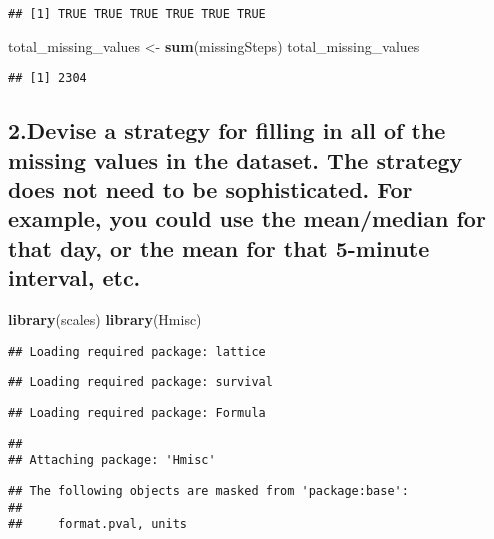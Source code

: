 \documentclass[]{article}
\newenvironment{Shaded}{\begin{snugshade}}{\end{snugshade}}
\newcommand{\KeywordTok}[1]{\textcolor[rgb]{0.13,0.29,0.53}{\textbf{#1}}}
\newcommand{\StringTok}[1]{\textcolor[rgb]{0.31,0.60,0.02}{#1}}
\newcommand{\NormalTok}[1]{#1}
\begin{document}
\begin{verbatim}
## [1] TRUE TRUE TRUE TRUE TRUE TRUE
\end{verbatim}

\begin{Shaded}
\begin{Highlighting}[]
\NormalTok{total_missing_values <-}\StringTok{ }\KeywordTok{sum}\NormalTok{(missingSteps)}
\NormalTok{total_missing_values}
\end{Highlighting}
\end{Shaded}

\begin{verbatim}
## [1] 2304
\end{verbatim}

\subsection{2.Devise a strategy for filling in all of the missing values
in the dataset. The strategy does not need to be sophisticated. For
example, you could use the mean/median for that day, or the mean for
that 5-minute interval,
etc.}\label{devise-a-strategy-for-filling-in-all-of-the-missing-values-in-the-dataset.-the-strategy-does-not-need-to-be-sophisticated.-for-example-you-could-use-the-meanmedian-for-that-day-or-the-mean-for-that-5-minute-interval-etc.}

\begin{Shaded}
\begin{Highlighting}[]
\KeywordTok{library}\NormalTok{(scales)}
\KeywordTok{library}\NormalTok{(Hmisc)}
\end{Highlighting}
\end{Shaded}

\begin{verbatim}
## Loading required package: lattice
\end{verbatim}

\begin{verbatim}
## Loading required package: survival
\end{verbatim}

\begin{verbatim}
## Loading required package: Formula
\end{verbatim}

\begin{verbatim}
## 
## Attaching package: 'Hmisc'
\end{verbatim}

\begin{verbatim}
## The following objects are masked from 'package:base':
## 
##     format.pval, units
\end{verbatim}
\end{document}
